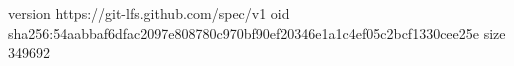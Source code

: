 version https://git-lfs.github.com/spec/v1
oid sha256:54aabbaf6dfac2097e808780c970bf90ef20346e1a1c4ef05c2bcf1330cee25e
size 349692
